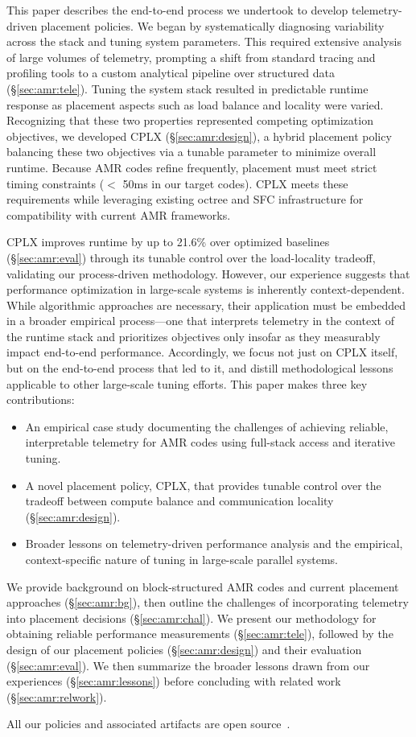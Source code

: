 This paper describes the end-to-end process we undertook to develop telemetry-driven placement
policies.
We began by systematically diagnosing variability across the stack and tuning system parameters.
This required extensive analysis of large volumes of telemetry, prompting a shift from standard
tracing and profiling tools to a custom analytical pipeline over structured data
(\S\ref{sec:amr:tele}).
Tuning the system stack resulted in predictable runtime response as placement aspects such as load
balance and locality were varied.
Recognizing that these two properties represented competing optimization objectives, we developed
CPLX (\S\ref{sec:amr:design}), a hybrid placement policy balancing these two objectives via a
tunable
parameter to minimize overall runtime.
Because AMR codes refine frequently, placement must meet strict timing constraints ($<$ 50ms in our
target codes).
CPLX meets these requirements while leveraging existing octree and SFC infrastructure for
compatibility with current AMR frameworks.

CPLX improves runtime by up to 21.6\% over optimized baselines (\S\ref{sec:amr:eval}) through its
tunable control over the load-locality tradeoff, validating our process-driven methodology.
However, our experience suggests that performance optimization in large-scale systems is inherently
context-dependent.
While algorithmic approaches are necessary, their application must be embedded in a broader
empirical process---one that interprets telemetry in the context of the runtime stack and
prioritizes
objectives only insofar as they measurably impact end-to-end performance.
Accordingly, we focus not just on CPLX itself, but on the end-to-end process that led to it, and
distill methodological lessons applicable to other large-scale tuning efforts.
This paper makes three key contributions:

\begin{itemize}
  \item An empirical case study documenting the challenges of achieving reliable,
        interpretable telemetry for AMR codes using full-stack access and iterative
        tuning.
  \item A novel placement policy, CPLX, that provides tunable control over the tradeoff
        between compute balance and communication locality (\S\ref{sec:amr:design}).
  \item Broader lessons on telemetry-driven performance analysis and the empirical,
        context-specific nature of tuning in large-scale parallel systems.
\end{itemize}

We provide background on block-structured AMR codes and current placement approaches
(\S\ref{sec:amr:bg}), then outline the challenges of incorporating telemetry into placement
decisions
(\S\ref{sec:amr:chal}).
We present our methodology for obtaining reliable performance measurements (\S\ref{sec:amr:tele}),
followed by the design of our placement policies (\S\ref{sec:amr:design}) and their evaluation
(\S\ref{sec:amr:eval}).
We then summarize the broader lessons drawn from our experiences (\S\ref{sec:amr:lessons}) before
concluding with related work (\S\ref{sec:amr:relwork}).

All our policies and associated artifacts are open source~\cite{Ankus2025:cplx}.
